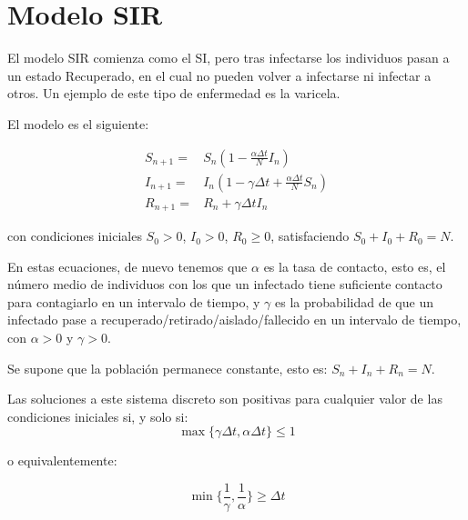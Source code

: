 \section{Modelo SIR}
El modelo SIR comienza como el SI, pero tras infectarse los individuos pasan a un estado Recuperado, en el cual no pueden volver a infectarse ni infectar a otros.
Un ejemplo de este tipo de enfermedad es la varicela. 

El modelo es el siguiente:

\begin{equation}
\label{eqn: SIR_modelo}
\begin{aligned}
S_{n+1} = & S_n \left(1-\frac{\alpha\Delta t}{N} I_n \right) \\
I_{n+1} = & I_n \left( 1-\gamma \Delta t + \frac{\alpha\Delta t}{N} S_n \right) \\
R_{n+1} = & R_n + \gamma \Delta t I_n
\end{aligned}
\end{equation}

con condiciones iniciales $S_0>0$, $I_0>0$, $R_0\geq 0$, satisfaciendo $S_0+I_0+R_0=N$.

En estas ecuaciones, de nuevo tenemos que $\alpha$ es la tasa de contacto, esto es, el número medio de individuos con los que un infectado tiene suficiente contacto para contagiarlo en un intervalo de tiempo, y $\gamma$ es la probabilidad de que un infectado pase a recuperado/retirado/aislado/fallecido en un intervalo de tiempo, con $\alpha >0$ y $\gamma >0$.

Se supone que la población permanece constante, esto es: $S_n+I_n+R_n=N$.

\begin{proposition}
Las soluciones a este sistema discreto son positivas para cualquier valor de las condiciones iniciales si, y solo si:
$$\max{\big\{\gamma\Delta t, \alpha\Delta t\big\} } \leq 1$$

o equivalentemente:

$$\min{\bigg\{ \frac{1}{\gamma}, \frac{1}{\alpha} \bigg\} } \geq \Delta t$$

\end{proposition}

